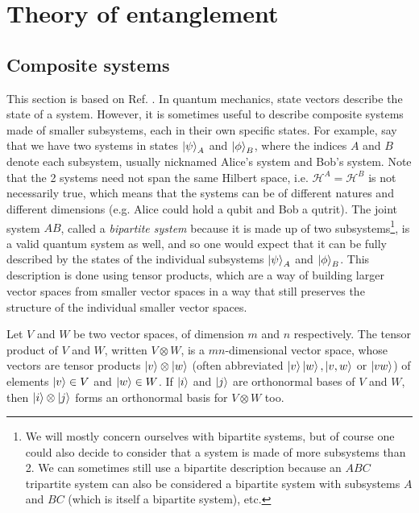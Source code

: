 \section{Theory of entanglement} \label{sec:entanglement}

\subsection{Composite systems}

This section is based on Ref. \cite[pp. 71-75, 93-96]{nielsen_quantum_2010}. In quantum mechanics, state vectors describe the state of a system. However, it is sometimes useful to describe composite systems made of smaller subsystems, each in their own specific states. For example, say that we have two systems in states $\ket{\psi}_A$ and $\ket{\phi}_B$, where the indices $A$ and $B$ denote each subsystem, usually nicknamed Alice's system and Bob's system. Note that the 2 systems need not span the same Hilbert space, i.e. $\mathcal{H}^A = \mathcal{H}^B$ is not necessarily true, which means that the systems can be of different natures and different dimensions (e.g. Alice could hold a qubit and Bob a qutrit). The joint system $AB$, called a \textit{bipartite system} because it is made up of two subsystems\footnote{We will mostly concern ourselves with bipartite systems, but of course one could also decide to consider that a system is made of more subsystems than 2. We can sometimes still use a bipartite description because an $ABC$ tripartite system can also be considered a bipartite system with subsystems $A$ and $BC$ (which is itself a bipartite system), etc.}, is a valid quantum system as well, and so one would expect that it can be fully described by the states of the individual subsystems $\ket{\psi}_A$ and $\ket{\phi}_B$. This description is done using tensor products, which are a way of building larger vector spaces from smaller vector spaces in a way that still preserves the structure of the individual smaller vector spaces.

\begin{definition}
    Let $V$ and $W$ be two vector spaces, of dimension $m$ and $n$ respectively. The tensor product of $V$ and $W$, written $V \otimes W$, is a $mn$-dimensional vector space, whose vectors are tensor products $\ket{v} \otimes \ket{w}$ (often abbreviated $\ket{v}\ket{w}, \ket{v, w}$ or $\ket{vw}$) of elements $\ket{v} \in V$ and $\ket{w} \in W$. If $\ket{i}$ and $\ket{j}$ are orthonormal bases of $V$ and $W$, then $\ket{i} \otimes \ket{j}$ forms an orthonormal basis for $V \otimes W$ too.
\end{definition}

